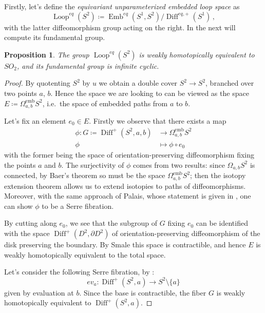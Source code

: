 \documentclass[a4paper, 11pt]{amsart}
\theoremstyle{plain}
\newtheorem{prop}{Proposition}[section]
\theoremstyle{definition}
\newcommand{\emb}{\text{emb}}
\DeclareMathOperator{\Emb}{Emb}
\DeclareMathOperator{\Loop}{Loop}
\DeclareMathOperator{\Diff}{Diff}
\begin{document}
Firstly, let's define the \emph{equivariant unparameterized embedded loop space} as
\[
	\Loop^{eq}(S^2) \coloneqq \Emb^{eq}(S^1,S^2)/\Diff^{eq,+}(S^1)\,,
\]
with the latter diffeomorphism group acting on the right. In the next  will compute its fundamental group.
\begin{prop}\label{EBaer}
	The group $\Loop^{eq}(S^2)$ is weakly homotopically equivalent to $SO_2$, and its fundamental group is infinite cyclic.	
\end{prop}
\begin{proof}
	By quotenting $S^2$ by $u$ we obtain a double cover $S^2 \to S^2$, branched over two points $a$,  $b$. Hence the space we are looking to can be viewed as the space $E \coloneqq \Omega_{a,b}^{\emb}S^2$, i.e.\ the space of embedded paths from $a$ to $b$. 
	
	Let's fix an element $e_0 \in E$. Firstly we observe that there exists a map
	\[
	\begin{split}
		\phi \colon G \coloneqq \Diff^+(S^2, a,b) &\to \Omega^{\emb}_{a,b}S^2\\
		\phi &\mapsto \phi\circ e_0
	\end{split}
	\]
	with the former being the space of orientation-preserving diffeomorphism fixing the points $a$ and $b$. The surjectivity of $\phi$ comes from two results: since $\Omega_{a,b}S^2$ is connected, by Baer's theorem \cite{BaerIsotope} so must be the space $\Omega_{a,b}^{\emb}S^2$; then the isotopy extension theorem allows us to extend isotopies to paths of diffeomorphisms. Moreover, with the same approach of Palais, whose statement is given in , one can show $\phi$ to be a Serre fibration.
	
	By cutting along $e_0$, we see that the subgroup of $G$ fixing $e_0$ can be identified with the space $\Diff^+(D^2, \partial D^2)$ of orientation-preserving diffeomorphism of the disk preserving the boundary. By Smale \cite{Smale1959} this space is contractible, and hence $E$ is weakly homotopically equivalent to the total space.
	
	Let's consider the following Serre fibration, by :
	\[
		ev_a \colon \Diff^+(S^2, a) \to S^2 \setminus \{a\}
	\]
	given by evaluation at $b$. Since the base is contractible, the fiber $G$ is weakly homotopically equivalent to $\Diff^+(S^2,a)$. 
	

\end{proof}
\end{document}
